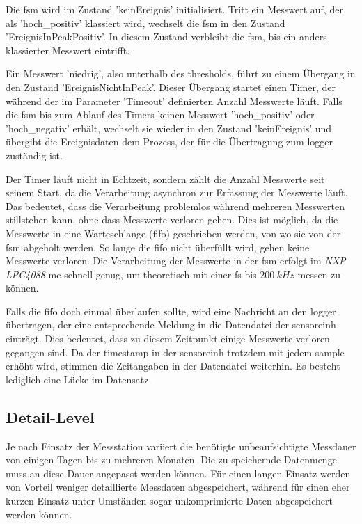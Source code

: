 Die \gls{fsm} wird im Zustand 'keinEreignis' initialisiert. Tritt ein Messwert auf, der als 'hoch\_positiv' klassiert wird, wechselt die \gls{fsm} in den Zustand 'EreignisInPeakPositiv'. In diesem Zustand verbleibt die \gls{fsm}, bis ein anders klassierter Messwert eintrifft. 

Ein Messwert 'niedrig', also unterhalb des \gls{threshold}s, führt zu einem Übergang in den Zustand 'EreignisNichtInPeak'. Dieser Übergang startet einen Timer, der während der im Parameter 'Timeout' definierten Anzahl Messwerte läuft. Falls die \gls{fsm} bis zum Ablauf des Timers keinen Messwert 'hoch\_positiv' oder 'hoch\_negativ' erhält, wechselt sie wieder in den Zustand 'keinEreignis' und übergibt die Ereignisdaten dem Prozess, der für die Übertragung zum \gls{logger} zuständig ist. 

Der Timer läuft nicht in Echtzeit, sondern zählt die Anzahl Messwerte seit seinem Start, da die Verarbeitung asynchron zur Erfassung der Messwerte läuft. Das bedeutet, dass die Verarbeitung problemlos während mehreren Messwerten stillstehen kann, ohne dass Messwerte verloren gehen. Dies ist möglich, da die Messwerte in eine Warteschlange (\gls{fifo}) geschrieben werden, von wo sie von der \gls{fsm} abgeholt werden. So lange die \gls{fifo} nicht überfüllt wird, gehen keine Messwerte verloren. Die Verarbeitung der Messwerte in der \gls{fsm} erfolgt im \emph{NXP LPC4088} \gls{mc} schnell genug, um theoretisch mit einer \gls{fs} bis \ensuremath{200~kHz} messen zu können.

Falls die \gls{fifo} doch einmal überlaufen sollte, wird eine Nachricht an den \gls{logger} übertragen, der eine entsprechende Meldung in die Datendatei der \gls{sensoreinh} einträgt. Dies bedeutet, dass zu diesem Zeitpunkt einige Messwerte verloren gegangen sind. Da der \gls{timestamp} in der \gls{sensoreinh} trotzdem mit jedem \gls{sample} erhöht wird, stimmen die Zeitangaben in der Datendatei weiterhin. Es besteht lediglich eine Lücke im Datensatz.


\subsection{Detail-Level}
Je nach Einsatz der Messstation variiert die benötigte unbeaufsichtigte Messdauer von einigen Tagen bis zu mehreren Monaten. Die zu speichernde Datenmenge muss an diese Dauer angepasst werden können. Für einen langen Einsatz werden von Vorteil weniger detaillierte Messdaten abgespeichert, während für einen eher kurzen Einsatz unter Umständen sogar unkomprimierte Daten abgespeichert werden können.

